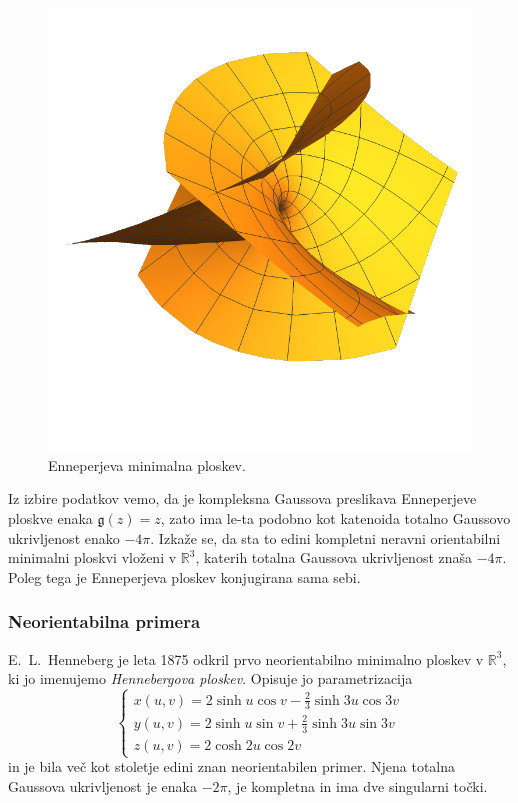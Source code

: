\documentclass[12pt,a4paper,twoside]{article}
\theoremstyle{definition} %
\theoremstyle{plain} %
\numberwithin{equation}{section}  %
\newcommand{\R}{\mathbb R}
\begin{document}
\begin{figure}[h!]
\begin{center}
\includegraphics[scale=0.8]{images/enneper.pdf}
\caption{Enneperjeva minimalna ploskev.}
\end{center}
\end{figure}

Iz izbire podatkov vemo, da je kompleksna Gaussova preslikava Enneperjeve ploskve enaka $\mathfrak{g}(z) = z$, zato ima le-ta podobno kot katenoida totalno Gaussovo ukrivljenost enako $-4 \pi$. Izkaže se, da sta to edini kompletni neravni orientabilni minimalni ploskvi vloženi v $\mathbb{R}^3$, katerih totalna Gaussova ukrivljenost znaša $-4 \pi$. Poleg tega je Enneperjeva ploskev konjugirana sama sebi.

\subsubsection{Neorientabilna primera}
%
E.~L.~Henneberg je leta 1875 odkril prvo neorientabilno minimalno ploskev v $\R^3$, ki jo imenujemo \emph{Hennebergova ploskev}.
Opisuje jo parametrizacija
%
\begin{equation}
\begin{cases}
x(u,v) = 2 \sinh u \cos v -\frac{2}{3} \sinh 3u \cos 3v \\
y(u,v) = 2 \sinh u \sin v + \frac{2}{3} \sinh 3u \sin 3v \\
z(u,v) = 2 \cosh 2u \cos 2v
\end{cases}
\end{equation}
in je bila več kot stoletje edini znan neorientabilen primer. Njena totalna Gaussova ukrivljenost je enaka $-2 \pi$, je kompletna in ima dve singularni točki.
\end{document}
